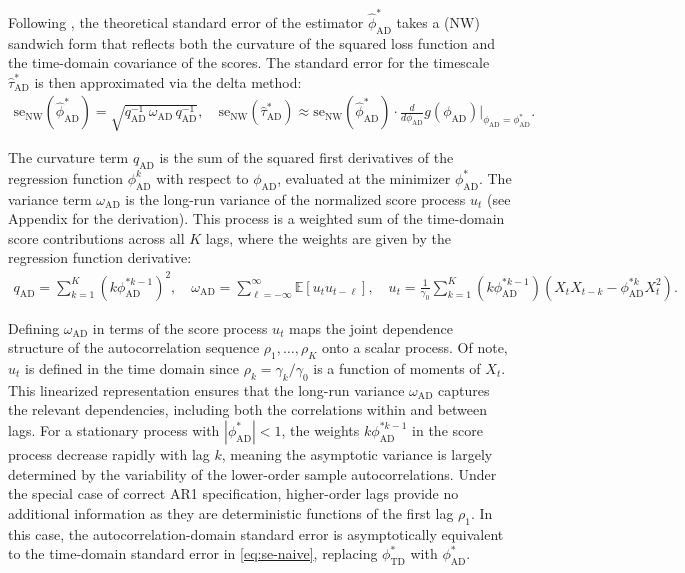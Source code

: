 \documentclass[9pt]{article}
\newcommand{\phitd}{\phi_{\scriptscriptstyle\text{TD}}}
\newcommand{\phiad}{\phi_{\scriptscriptstyle\text{AD}}}
\newcommand{\hatphiad}{\hat{\phi}^*_{\scriptscriptstyle\text{AD}}}
\newcommand{\hattauad}{\hat{\tau}^*_{\scriptscriptstyle\text{AD}}}
\newcommand{\qad}{q_{\scriptscriptstyle\text{AD}}}
\newcommand{\omegaad}{\omega_{\scriptscriptstyle\text{AD}}}
\begin{document}
Following \citet[Chapter~22.8 and Chapter~23.5]{hansen_econometrics_2022}, the theoretical standard error of the estimator $\hatphiad$ takes a \citet{newey_simple_1987} (NW) sandwich form that reflects both the curvature of the squared loss function and the time-domain covariance of the scores. The standard error for the timescale $\hattauad$ is then approximated via the delta method:
\begin{align}\label{eq:stderr-autocorrelation-domain}
    \text{se}_{\text{NW}}(\hatphiad) = \sqrt{\qad^{-1}\, \omegaad \,\qad^{-1}}, \quad 
    \text{se}_{\text{NW}}(\hattauad) \approx \text{se}_{\text{NW}}(\hatphiad) \cdot \frac{d}{d\phiad}g(\phiad)\Big|_{\phiad=\phiad^*}.
\end{align}

\noindent The curvature term $\qad$ is the sum of the squared first derivatives of the regression function $\phiad^k$ with respect to $\phiad$, evaluated at the minimizer $\phiad^*$. The variance term $\omegaad$ is the long-run variance of the normalized score process $u_t$ (see Appendix for the derivation). This process is a weighted sum of the time-domain score contributions across all $K$ lags, where the weights are given by the regression function derivative:
\begin{align}\label{eq:ad-qomega}
    \qad = \sum_{k=1}^K (k \phiad^{*k-1})^2, \quad \omegaad = \sum_{\ell=-\infty}^{\infty} \mathbb{E}[u_t u_{t-\ell}], \quad 
    u_t = \frac{1}{\gamma_0} \sum_{k=1}^K (k \phiad^{*k-1}) (X_t X_{t-k} - \phiad^{*k}X_t^2).
\end{align}

Defining $\omegaad$ in terms of the score process $u_t$ maps the joint dependence structure of the autocorrelation sequence $\rho_1, \dots, \rho_K$ onto a scalar process. Of note, $u_t$ is defined in the time domain since $\rho_k=\gamma_k/\gamma_0$ is a function of moments of $X_t$. This linearized representation ensures that the long-run variance $\omegaad$ captures the relevant dependencies, including both the correlations within and between lags. For a stationary process with $|\phiad^*| < 1$, the weights $k\phiad^{*k-1}$ in the score process decrease rapidly with lag $k$, meaning the asymptotic variance is largely determined by the variability of the lower-order sample autocorrelations. Under the special case of correct AR1 specification, higher-order lags provide no additional information as they are deterministic functions of the first lag $\rho_1$. In this case, the autocorrelation-domain standard error is asymptotically equivalent to the time-domain standard error in \eqref{eq:se-naive}, replacing $\phitd^*$ with $\phiad^*$.
\end{document}
